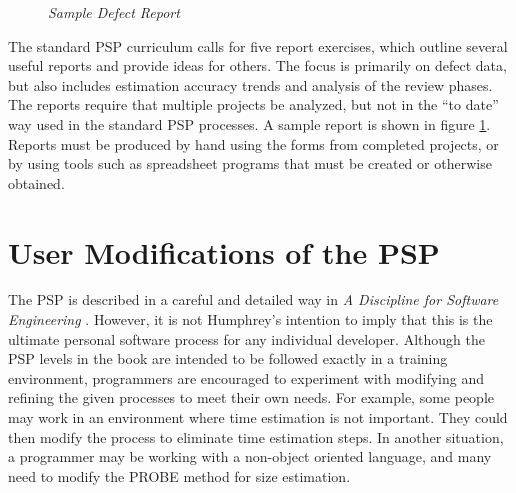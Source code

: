 \begin{figure} [hp]
    {\centerline{}}
    \caption[Sample Defect Report]{\label{fig:pspReport}
    {\em Sample Defect Report}}
\end{figure}


The standard PSP curriculum calls for five report exercises, which outline
several useful reports and provide ideas for others.  The focus is
primarily on defect data, but also includes estimation accuracy trends
and analysis of the review phases. The reports require that multiple
projects be analyzed, but not in the ``to date'' way used in the standard
PSP processes.  A sample report is shown in figure \ref{fig:pspReport}.
Reports must be produced by hand using the forms from completed projects,
or by using tools such as spreadsheet programs that must be created or
otherwise obtained.

\section{User Modifications of the PSP}

The PSP is described in a careful and detailed way in {\it A Discipline for
  Software Engineering} \cite{Humphrey95}.  However, it is not Humphrey's
intention to imply that this is the ultimate personal software process for
any individual developer.  Although the PSP levels in the book are intended
to be followed exactly in a training environment, programmers are
encouraged to experiment with modifying and refining the given processes to
meet their own needs.  For example, some people may work in an environment
where time estimation is not important.  They could then modify the process
to eliminate time estimation steps.  In another situation, a programmer may
be working with a non-object oriented language, and many need to modify the
PROBE method for size estimation.

